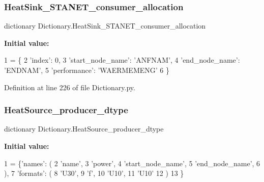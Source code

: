 \subsubsection{\texorpdfstring{Heat\+Sink\+\_\+\+S\+T\+A\+N\+E\+T\+\_\+consumer\+\_\+allocation}{HeatSink\_STANET\_consumer\_allocation}}
{\footnotesize\ttfamily dictionary Dictionary.\+Heat\+Sink\+\_\+\+S\+T\+A\+N\+E\+T\+\_\+consumer\+\_\+allocation}

{\bfseries Initial value\+:}
\begin{DoxyCode}
1 =  \{
2                                 \textcolor{stringliteral}{'index'}: 0,
3                                 \textcolor{stringliteral}{'start\_node\_name'}: \textcolor{stringliteral}{'ANFNAM'},
4                                 \textcolor{stringliteral}{'end\_node\_name'}: \textcolor{stringliteral}{'ENDNAM'},
5                                 \textcolor{stringliteral}{'performance'}: \textcolor{stringliteral}{'WAERMEMENG'}
6                                 \}
\end{DoxyCode}


Definition at line 226 of file Dictionary.\+py.

\mbox{\label{namespace_dictionary_abeaeccad0ef3f237fd95ed21a43fa64e}} 
\subsubsection{\texorpdfstring{Heat\+Source\+\_\+producer\+\_\+dtype}{HeatSource\_producer\_dtype}}
{\footnotesize\ttfamily dictionary Dictionary.\+Heat\+Source\+\_\+producer\+\_\+dtype}

{\bfseries Initial value\+:}
\begin{DoxyCode}
1 =  \{\textcolor{stringliteral}{'names'}: (
2                                      \textcolor{stringliteral}{'name'},
3                                      \textcolor{stringliteral}{'power'},
4                                      \textcolor{stringliteral}{'start\_node\_name'},
5                                      \textcolor{stringliteral}{'end\_node\_name'},
6                                      ),
7                             \textcolor{stringliteral}{'formats'}: (
8                                         \textcolor{stringliteral}{'U30'},
9                                         \textcolor{stringliteral}{'f'},
10                                         \textcolor{stringliteral}{'U10'},
11                                         \textcolor{stringliteral}{'U10'}
12                                         )
13                             \}
\end{DoxyCode}


